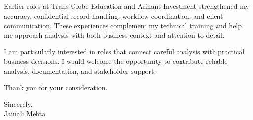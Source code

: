 \documentclass[letterpaper,10pt]{article}
\begin{document}
Earlier roles at Trans Globe Education and Arihant Investment strengthened my accuracy, confidential record handling, workflow coordination, and client communication. These experiences complement my technical training and help me approach analysis with both business context and attention to detail.

I am particularly interested in roles that connect careful analysis with practical business decisions. I would welcome the opportunity to contribute reliable analysis, documentation, and stakeholder support.

Thank you for your consideration.

Sincerely,\\
Jainali Mehta
\end{document}

